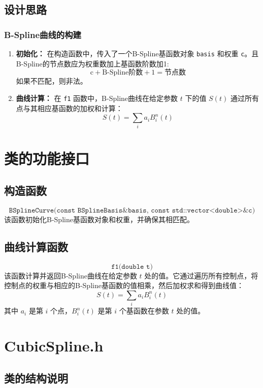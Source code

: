 \documentclass[a4paper]{article}
\begin{document}
\subsection{设计思路}

\subsubsection{B-Spline曲线的构建}
\begin{enumerate}
    \item \textbf{初始化：} 在构造函数中，传入了一个B-Spline基函数对象 \texttt{basis} 和权重 \texttt{c}。且B-Spline的节点数应为权重数加上基函数阶数加1:
    \[
    \text{c} + \text{B-Spline阶数} + 1 = \text{节点数}
    \]
    如果不匹配，则非法。
    \item \textbf{曲线计算：} 在 \texttt{f1} 函数中，B-Spline曲线在给定参数 \( t \) 下的值 \( S(t) \) 通过所有点与其相应基函数的加权和计算：
    \[
    S(t) = \sum_{i} a_i B_i^n(t)
    \]
\end{enumerate}

\section{类的功能接口}

\subsection{构造函数}

\[
\texttt{BSplineCurve(const BSplineBasis\& basis, const std::vector<double>\& c)}
\]
该函数初始化B-Spline基函数对象和权重，并确保其相匹配。

\subsection{曲线计算函数}

\[
\texttt{f1(double t)}
\]
该函数计算并返回B-Spline曲线在给定参数 \( t \) 处的值。它通过遍历所有控制点，将控制点的权重与相应的B-Spline基函数的值相乘，然后加权求和得到曲线值：
\[
S(t) = \sum_{i} a_i B_i^n(t)
\]
其中 \( a_i \) 是第 \( i \) 个点，\( B_i^n(t) \) 是第 \( i \) 个基函数在参数 \( t \) 处的值。

\section{CubicSpline.h}
\subsection{类的结构说明}
\end{document}
